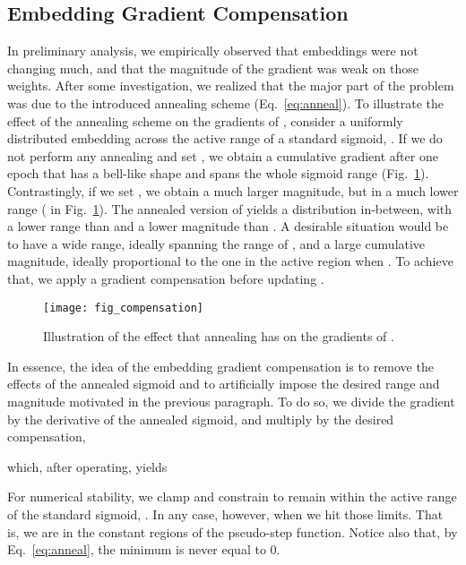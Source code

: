 \subsection{Embedding Gradient Compensation}
\label{sec:Method_Compens}

In preliminary analysis, we empirically observed that embeddings  were not changing much, and that the magnitude of the gradient was weak on those weights. After some investigation, we realized that the major part of the problem was due to the introduced annealing scheme (Eq.~\ref{eq:anneal}). To illustrate the effect of the annealing scheme on the gradients of , consider a uniformly distributed embedding  across the active range of a standard sigmoid, . If we do not perform any annealing and set , we obtain a cumulative gradient after one epoch that has a bell-like shape and spans the whole sigmoid range (Fig.~\ref{fig:compensation}). Contrastingly, if we set , we obtain a much larger magnitude, but in a much lower range ( in Fig.~\ref{fig:compensation}). The annealed version of  yields a distribution in-between, with a lower range than  and a lower magnitude than . A desirable situation would be to have a wide range, ideally spanning the range of , and a large cumulative magnitude, ideally proportional to the one in the active region when . To achieve that, we apply a gradient compensation before updating .

\begin{figure}[t]
\begin{center}
	\texttt{[image: fig\_compensation]}
\vskip -0.15in
	\caption{Illustration of the effect that annealing  has on the gradients  of .}
	\label{fig:compensation}
	\end{center}
	\vskip -0.1in
\end{figure} 

In essence, the idea of the embedding gradient compensation is to remove the effects of the annealed sigmoid and to artificially impose the desired range and magnitude motivated in the previous paragraph. To do so, we divide the gradient  by the derivative of the annealed sigmoid, and multiply by the desired compensation,

which, after operating, yields

For numerical stability, we clamp  and constrain  to remain within the active range of the standard sigmoid, . In any case, however,  when we hit those limits. That is, we are in the constant regions of the pseudo-step function. Notice also that, by Eq.~\ref{eq:anneal}, the minimum  is never equal to 0.

